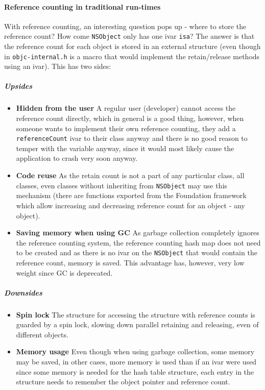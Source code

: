 \paragraph{Reference counting in traditional run-times} With reference counting, an interesting question pops up - where to store the reference count? How come \verb=NSObject= only has one ivar \verb=isa=? The answer is that the reference count for each object is stored in an external structure (even though in \verb=objc-internal.h= is a macro that would implement the retain/release methods using an ivar). This has two sides:
\subparagraph{Upsides}
\begin{itemize}
  \item{\bf{Hidden from the user}} A regular user (developer) cannot access the reference count directly, which in general is a good thing, however, when someone wants to implement their own reference counting, they add a \verb=referenceCount= ivar to their class anyway and there is no good reason to temper with the variable anyway, since it would most likely cause the application to crash very soon anyway.
  \item{\bf{Code reuse}} As the retain count is not a part of any particular class, all classes, even classes without inheriting from \verb=NSObject= may use this mechanism (there are functions exported from the Foundation framework which allow increasing and decreasing reference count for an object - any object).
  \item{\bf{Saving memory when using GC}} As garbage collection completely ignores the reference counting system, the reference counting hash map does not need to be created and as there is no ivar on the \verb=NSObject= that would contain the reference count, memory is saved. This advantage has, however, very low weight since GC is deprecated.
\end{itemize}
\subparagraph{Downsides}
\begin{itemize}
  \item{\bf{Spin lock}} The structure for accessing the structure with reference counts is guarded by a spin lock, slowing down parallel retaining and releasing, even of different objects.
  \item{\bf{Memory usage}} Even though when using garbage collection, some memory may be saved, in other cases, more memory is used than if an ivar were used since some memory is needed for the hash table structure, each entry in the structure needs to remember the object pointer and reference count.
\end{itemize}

